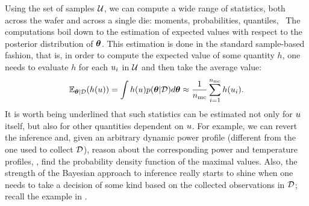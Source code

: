 Using the set of samples $\mathcal{U}$, we can compute a wide range of statistics, both across the wafer and across a single die: moments, probabilities, quantiles, \etc\ The computations boil down to the estimation of expected values with respect to the posterior distribution of ${\boldsymbol\theta}$. This estimation is done in the standard sample-based fashion, that is, in order to compute the expected value of some quantity $h$, one needs to evaluate $h$ for each $u_i$ in $\mathcal{U}$ and then take the average value:
\[
  \E_{\vparam | \Data}(h(\u)) = \int h(\u) \f{\vparam | \Data} d\vparam \approx \frac{1}{\nsamples} \sum_{i = 1}^\nsamples h(\u_i).
\]
It is worth being underlined that such statistics can be estimated not only for $u$ itself, but also for other quantities dependent on $u$. For example, we can revert the inference and, given an arbitrary dynamic power profile (different from the one used to collect $\mathcal{D}$), reason about the corresponding power and temperature profiles, \eg, find the probability density function of the maximal values. Also, the strength of the Bayesian approach to inference really starts to shine when one needs to take a decision of some kind based on the collected observations in $\mathcal{D}$; recall the example in .
